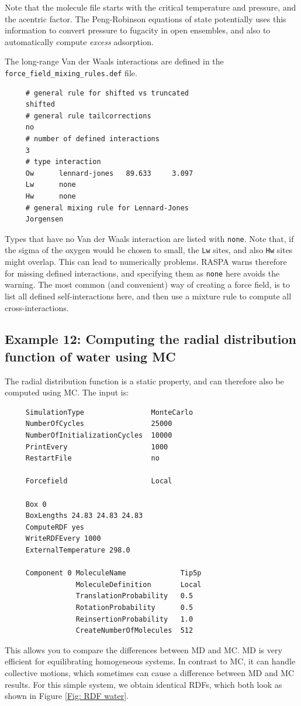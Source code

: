 Note that the molecule file starts with the critical temperature and pressure, and the acentric factor.
The Peng-Robinson equations of state potentially uses this information to convert pressure to fugacity in open ensembles,
and also to automatically compute \emph{excess }adsorption.

The long-range Van der Waals interactions are defined in the \verb+force_field_mixing_rules.def+ file.
\begin{tiny}
\begin{verbatim}
     # general rule for shifted vs truncated
     shifted
     # general rule tailcorrections
     no
     # number of defined interactions
     3
     # type interaction
     Ow      lennard-jones   89.633     3.097
     Lw      none
     Hw      none
     # general mixing rule for Lennard-Jones
     Jorgensen
\end{verbatim}
\end{tiny}
Types that have no Van der Waals interaction are listed with \verb+none+. Note that, if the sigma of the oxygen 
would be chosen to small, the \verb+Lw+ sites, and also \verb+Hw+ sites might overlap.
This can lead to numerically problems. RASPA warns therefore for missing defined interactions, and specifying them as \verb+none+ here avoids the warning.
The most common (and convenient) way of creating a force field, is to list all defined self-interactions here, and then use a mixture rule to compute
all cross-interactions.


\subsection*{Example 12: Computing the radial distribution function of water using MC}

The radial distribution function is a static property, and can therefore also be computed using MC.
The input is:
\begin{tiny}
\begin{verbatim}
     SimulationType                MonteCarlo
     NumberOfCycles                25000
     NumberOfInitializationCycles  10000
     PrintEvery                    1000
     RestartFile                   no
     
     Forcefield                    Local
     
     Box 0
     BoxLengths 24.83 24.83 24.83
     ComputeRDF yes
     WriteRDFEvery 1000
     ExternalTemperature 298.0
     
     Component 0 MoleculeName             Tip5p
                 MoleculeDefinition       Local
                 TranslationProbability   0.5
                 RotationProbability      0.5
                 ReinsertionProbability   1.0
                 CreateNumberOfMolecules  512
\end{verbatim}
\end{tiny}
This allows you to compare the differences between MD and MC. MD is very efficient for equilibrating homogeneous systems.
In contrast to MC, it can handle collective motions, which sometimes can cause a difference between MD and MC results.
For this simple system, we obtain identical RDFs, which both look as shown in Figure \ref{Fig: RDF water}.

